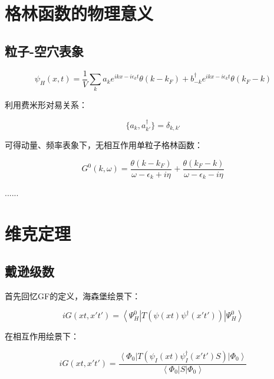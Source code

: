 \section{格林函数的物理意义}

\subsection{粒子-空穴表象}

\begin{equation}
\psi_H(x,t) = \frac{1}{V}\sum\limits_k a_k e^{i kx - i \epsilon_k t} \theta(k - k_F) + b_{-k}^\dagger e^{i kx - i \epsilon_k t} \theta(k_F -k)
\end{equation}

利用费米形对易关系：

\begin{equation}
\{ a_k , a_{k'}^\dagger  \} = \delta_{k,k'}
\end{equation}

可得动量、频率表象下，无相互作用单粒子格林函数：

\begin{equation}
G^0 (k,\omega) = \frac{\theta (k - k_F)}{\omega - \epsilon_k + i \eta  } + \frac{\theta (k_F - k )}{\omega - \epsilon_k - i \eta  }
\end{equation}

......


\section{维克定理}

\subsection{戴逊级数}

首先回忆GF的定义，海森堡绘景下：

\begin{equation*}
iG(xt, x't') = \left\langle \Psi_H^0 \right| T (\psi(xt) \psi^\dagger (x't') ) \left| \Psi_H^0 \right\rangle
\end{equation*}

在相互作用绘景下：

\begin{equation*}
iG(xt, x't') =\frac{ \left\langle \Phi_0 \right| T (\psi_I(xt) \psi_I^\dagger (x't') S )  \left| \Phi_0 \right\rangle }{ \left\langle \Phi_0 \right|  S \left| \Phi_0 \right\rangle }
\end{equation*}

